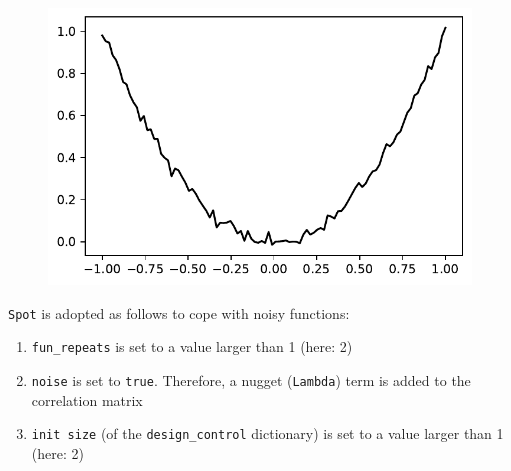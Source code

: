 \documentclass[
  letterpaper,
  DIV=11,
  numbers=noendperiod]{scrreprt}
\providecommand{\tightlist}{%
  \setlength{\itemsep}{0pt}\setlength{\parskip}{0pt}}\usepackage{longtable,booktabs,array}
\begin{document}
\begin{figure}[H]

{\centering \includegraphics{08_spot_noisy_files/figure-pdf/cell-4-output-1.pdf}

}

\end{figure}

\texttt{Spot} is adopted as follows to cope with noisy functions:

\begin{enumerate}
\def\labelenumi{\arabic{enumi}.}
\tightlist
\item
  \texttt{fun\_repeats} is set to a value larger than 1 (here: 2)
\item
  \texttt{noise} is set to \texttt{true}. Therefore, a nugget
  (\texttt{Lambda}) term is added to the correlation matrix
\item
  \texttt{init\ size} (of the \texttt{design\_control} dictionary) is
  set to a value larger than 1 (here: 2)
\end{enumerate}
\end{document}
